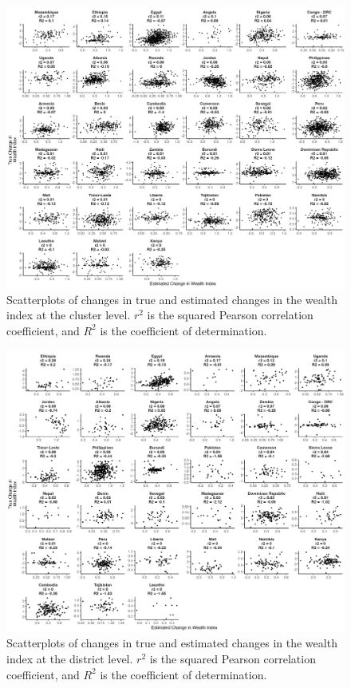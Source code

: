 \documentclass{article}
\begin{document}
\begin{figure}[H]
    \centering
    \includegraphics[width=1\textwidth]{figures/changes_scatter_cluster.png}
    \caption{Scatterplots of changes in true and estimated changes in the wealth index at the cluster level.  $r^2$ is the squared Pearson correlation coefficient, and $R^2$ is the coefficient of determination.}
     \label{fig:changes_scatter_cluster}
\end{figure}

\begin{figure}[H]
    \centering
    \includegraphics[width=1\textwidth]{figures/changes_scatter_adm2.png}
    \caption{Scatterplots of changes in true and estimated changes in the wealth index at the district level. \color{black} $r^2$ is the squared Pearson correlation coefficient, and $R^2$ is the coefficient of determination.}
     \label{fig:changes_scatter_adm2}
\end{figure}
\end{document}
